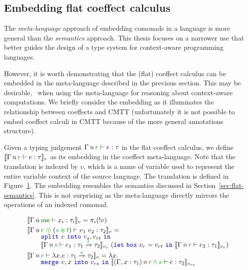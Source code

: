 
\subsection{Embedding flat coeffect calculus}

The \emph{meta-language} approach of embedding comonads in a language is more general than the
\emph{semantics} approach. This thesis focuses on a narrower use that better guides the design of
a type system for context-aware programming languages.

However, it is worth demonstrating that the (flat) coeffect calculus can be embedded in the
meta-language described in the previous section. This may be desirable, \eg~when using the
meta-language for reasoning about context-aware computations. We briefly consider the embedding
as it illuminates the relationship between coeffects and CMTT (unfortunately it is not possible
to embed coeffect calculi in CMTT because of the more general annotations structure).

Given a typing judgement $\coctx{\Gamma}{\cclrd{r}} \vdash e : \tau$ in the flat coeffect calculus,
we define $\sem{\coctx{\Gamma}{\cclrd{r}} \vdash e : \tau}_v$ as its embedding in the coeffect
meta-language. Note that the translation is indexed by $v$, which is a name of variable used
to represent the entire variable context of the source language. The translation is defined in
Figure~\ref{fig:conclusions-embed}. The embedding resembles the semantics discussed in
Section~\ref{sec:flat-semantics}. This is not surprising as the meta-language directly mirrors
the operations of an indexed comonad.


\begin{figure}[t]
\begin{equation*}
\begin{array}{l}
 \sem{ \coctx{\Gamma}{\cunit}\vdash x_i : \tau_i }_v = \pi_i (!v) \\[0.25em]
 \sem{ \coctx{\Gamma}{\cclrd{r}\;\cpar\;(\cclrd{s}\,\cseq\,\cclrd{t})} \vdash e_1~e_2 : \tau_2 }_v =\\[-0.25em]
   \qquad \kvd{split}~v~\kvd{into}~v_s, v_{rt}~\kvd{in} \\[-0.25em]
   \qquad \sem{ \coctx{\Gamma}{\cclrd{s}} \vdash e_1 : \tau_1 \xrightarrow{\cclrd{t}} \tau_2 }_{v_s}
      ~(\kvd{let\;box}~v_r = v_{rt}~\kvd{in}~\sem{ \coctx{\Gamma}{\cclrd{r}} \vdash e_2 : \tau_1}_{v_r}) \\[0.25em]
 \sem{ \coctx{\Gamma}{\cclrd{r}} \vdash \lambda x.e:\tau_1 \xrightarrow{\cclrd{s}} \tau_2 }_v = \lambda x. \\[-0.25em]
   \qquad \kvd{merge}~v,x~\kvd{into}~v_{rs}~\kvd{in}~\sem{ \coctx{(\Gamma,x:\tau_1)}{\cclrd{r}\,\czip\,\cclrd{s}} \vdash e : \tau_2 }_{v_{rs}}
\end{array}
\end{equation*}
\label{fig:conclusions-embed}
\end{figure}


